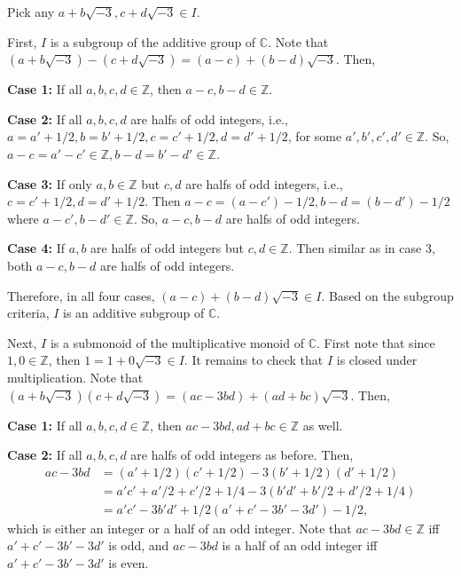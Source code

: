 \documentclass[12pt]{article}
\begin{document}
\begin{fproof}[Jacobson 2.1.4]
  Pick any \(a + b \sqrt{-3}, c + d \sqrt{-3} \in I\).

  First, \(I\) is a subgroup of the additive group of \(\mathbb{C}\).
  Note that\((a + b \sqrt{-3}) - (c + d \sqrt{-3}) = (a-c) + (b-d) \sqrt{-3}\).
  Then,

  \textbf{Case 1:} If all \(a,b,c,d \in \mathbb{Z}\), then \(a-c, b-d \in \mathbb{Z}\).

  \textbf{Case 2:} If all \(a,b,c,d\) are halfs of odd integers, i.e., \(a = a' + 1/2, b = b' + 1/2, c = c' + 1/2, d = d' + 1/2\), for some \(a',b',c',d' \in \mathbb{Z}\).
  So, \(a-c = a'-c' \in \mathbb{Z}, b-d = b'-d' \in \mathbb{Z}\).

  \textbf{Case 3:} If only \(a,b \in \mathbb{Z}\) but \(c,d\) are halfs of odd integers, i.e., \(c = c' + 1/2, d = d' + 1/2\).
  Then \(a-c = (a-c') - 1/2, b-d = (b - d') - 1/2\) where \(a-c', b-d' \in \mathbb{Z}\). So, \(a-c, b-d\) are halfs of odd integers.

  \textbf{Case 4:} If \(a,b\) are halfs of odd integers but \(c,d \in \mathbb{Z}\). Then similar as in case 3, both \(a-c, b-d\) are halfs of odd integers.

  Therefore, in all four cases, \((a-c) + (b-d) \sqrt{-3} \in I\). Based on the subgroup criteria, \(I\) is an additive subgroup of \(\mathbb{C}\).

  Next, \(I\) is a submonoid of the multiplicative monoid of \(\mathbb{C}\).
  First note that since \(1, 0 \in \mathbb{Z}\), then \(1 = 1 + 0 \sqrt{-3} \in I\). It remains to check that \(I\) is closed under multiplication.
  Note that \((a + b \sqrt{-3})(c + d \sqrt{-3}) = (ac - 3bd) + (ad + bc) \sqrt{-3}\). Then,

  \textbf{Case 1:} If all \(a,b,c,d \in \mathbb{Z}\), then \(ac-3bd, ad+bc \in \mathbb{Z}\) as well.

  \textbf{Case 2:} If all \(a,b,c,d\) are halfs of odd integers as before. Then,
  \begin{align*}
    ac - 3bd &= (a' + 1/2)(c' + 1/2) - 3(b'+1/2)(d'+1/2) \\
    & = a'c' + a'/2 + c'/2 + 1/4 - 3(b'd' + b'/2 + d'/2 + 1/4) \\
    & = a'c'- 3b'd' + 1/2(a' + c' -3b' - 3d') - 1/2,
  \end{align*}
  which is either an integer or a half of an odd integer. Note that \(ac - 3bd \in \mathbb{Z}\) iff \(a' + c' -3b' - 3d'\) is odd, and \(ac - 3bd\) is a half of an odd integer iff \(a' + c' -3b' - 3d'\) is even. 
  

\end{fproof}
\end{document}
